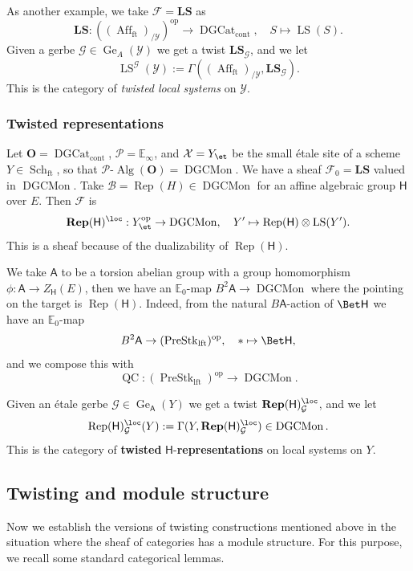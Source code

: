 \documentclass[10pt]{amsart}
\newcommand{\sssec}{\subsubsection}
\theoremstyle{remark}
\newcommand{\E}{\mathbb{E}}
\newcommand{\cP}{\mathcal{P}}
\newcommand{\on}{\operatorname}
\newcommand{\cB}{\mathcal{B}}
\newcommand{\cF}{\mathcal{F}}
\newcommand{\cG}{\mathcal{G}}
\newcommand{\cX}{\mathcal{X}}
\newcommand{\cY}{\mathcal{Y}}
\newcommand{\DGcat}{\on{DGCat}_{\on{cont}}}
\newcommand{\DGCatSymMon}{\on{DGCMon}}
\newcommand{\lAlg}{\text{-}\on{Alg}}
\newcommand{\Rep}{\on{Rep}}
\newcommand{\LS}{\on{LS}}
\newcommand{\PreStklft}{\on{PreStk}_{\on{lft}}}
\newcommand{\Affft}{\on{Aff}_{\on{ft}}}
\newcommand{\Schft}{\on{Sch}_{\on{ft}}}
\DeclareMathOperator{\op}{op}
\newcommand{\bO}{\mathbf{O}}
\newcommand{\sfA}{\mathsf{A}}
\begin{document}
As another example, we take $\cF=\mathbf{LS}$ as
\begin{equation}\label{eq: bold LS}
    \mathbf{LS}: \left((\Affft)_{/\cY}\right)^{\op}\rightarrow \DGcat,\quad S\mapsto \LS(S).
\end{equation}
Given a gerbe $\cG\in\on{Ge}_A(\cY)$ we get a twist $\mathbf{LS}_{\cG}$, and we let
\[\LS^{\cG}(\cY):=\Gamma((\Affft)_{/\cY}, \mathbf{LS}_{\cG}).\]
This is the category of \emph{twisted local systems} on $\cY$.



\sssec{Twisted representations}\label{sssec: twisted representations}
Let $\bO=\DGcat$, $\cP=\E_{\infty}$, and $\cX=Y_{\et}$ be the small \'etale site of a scheme $Y\in\Schft$, so that $\cP\lAlg(\bO)=\DGCatSymMon$. We have a sheaf $\cF_0=\mathbf{LS}$ valued in $\DGCatSymMon$. Take $\cB=\Rep(H)\in\DGCatSymMon$ for an affine algebraic group $\mathsf{H}$ over $E$. 
Then $\cF$ is
\begin{equation}\label{eq: bold Rep H loc}
    \mathbf{Rep}(\mathsf{H})^{\loc}: Y^{\op}_{\et}\rightarrow \DGCatSymMon,\quad Y'\mapsto \Rep(\mathsf{H})\otimes\LS(Y').
\end{equation}
This is a sheaf because of the dualizability of $\Rep(\mathsf{H})$.
\medskip

We take $\sfA$ to be a torsion abelian group with a group homomorphism $\phi:\sfA\rightarrow Z_\mathsf{H}(E)$, then we have an $\E_0$-map $B^2 \sfA\rightarrow \DGCatSymMon$ where the pointing on the target is $\Rep(\mathsf{H})$. Indeed, from the natural $B\sfA$-action of $\Bet \mathsf{H}$  we have an $\E_0$-map 
\[B^2\sfA\rightarrow(\PreStklft)^{\op},\quad \ast\mapsto \Bet \mathsf{H},\]
and we compose this with 
\[\on{QC}:(\PreStklft)^{\op}\rightarrow\DGCatSymMon.\]

Given an \'etale gerbe $\cG\in \on{Ge}_{\sfA}(Y)$ we get a twist $\mathbf{Rep}(\mathsf{H})^{\loc}_{\cG}$, and we let
\[\Rep(\mathsf{H})^{\loc}_{\cG}(Y):=\Gamma(Y,\mathbf{Rep}(\mathsf{H})^{\loc}_{\cG}) \in\DGCatSymMon.\]
This is the category of \textbf{twisted} $\mathsf{H}$-\textbf{representations} on local systems on $Y$.


\subsection{Twisting and module structure}\label{ssec: twisting modules}
Now we establish the versions of twisting constructions mentioned above in the situation where the sheaf of categories has a module structure. For this purpose, we recall some standard categorical lemmas.
\end{document}
